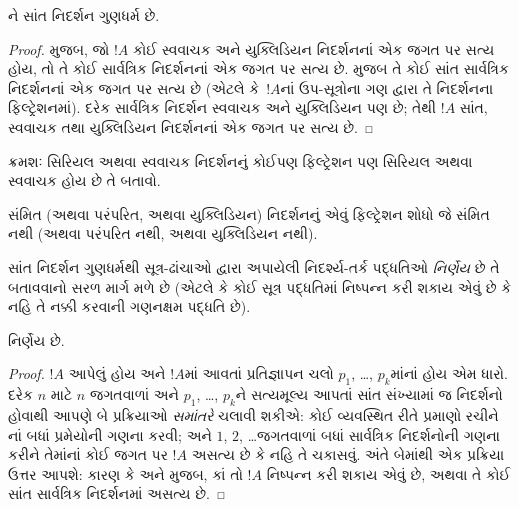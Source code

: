 \begin{cor}
  ને સાંત નિદર્શન ગુણધર્મ છે.
\end{cor}

\begin{proof}
   મુજબ, જો $!A$ કોઈ સ્વવાચક
  અને યુક્લિડિયન નિદર્શનનાં એક જગત પર સત્ય હોય, તો તે કોઈ
  સાર્વત્રિક નિદર્શનનાં એક જગત પર સત્ય છે.
   મુજબ તે કોઈ સાંત સાર્વત્રિક નિદર્શનનાં એક
  જગત પર સત્ય છે (એટલે કે~$!A$નાં ઉપ-સૂત્રોના ગણ દ્વારા
  તે નિદર્શનના ફિલ્ટ્રેશનમાં). દરેક સાર્વત્રિક નિદર્શન
  સ્વવાચક અને યુક્લિડિયન પણ છે; તેથી $!A$ સાંત,
  સ્વવાચક તથા યુક્લિડિયન નિદર્શનનાં એક જગત પર સત્ય છે.
\end{proof}

\begin{prob}
  ક્રમશઃ સિરિયલ અથવા સ્વવાચક નિદર્શનનું કોઈપણ
  ફિલ્ટ્રેશન પણ સિરિયલ અથવા સ્વવાચક હોય છે તે બતાવો.
\end{prob}

\begin{prob}
  સંમિત (અથવા પરંપરિત, અથવા યુક્લિડિયન) નિદર્શનનું એવું
  ફિલ્ટ્રેશન શોધો જે સંમિત નથી (અથવા પરંપરિત નથી, અથવા
  યુક્લિડિયન નથી).
\end{prob}
\endgroup

\begingroup
\makeatletter{}\makeatother


\label{guunit:OLP-0457}

સાંત નિદર્શન ગુણધર્મથી સૂત્ર-ઢાંચાઓ દ્વારા અપાયેલી નિદર્શ્ય-તર્ક
પદ્ધતિઓ \emph{નિર્ણેય} છે તે બતાવવાનો સરળ માર્ગ મળે છે (એટલે કે
કોઈ સૂત્ર પદ્ધતિમાં નિષ્પન્ન કરી શકાય એવું છે કે નહિ તે નક્કી કરવાની
ગણનક્ષમ પદ્ધતિ છે).

\begin{thm}
   નિર્ણેય છે.
\end{thm}

\begin{proof}
  $!A$ આપેલું હોય અને $!A$માં આવતાં પ્રતિજ્ઞાપન ચલો
  $p_1$, \dots, $p_k$માંનાં હોય એમ ધારો. દરેક $n$ માટે $n$ જગતવાળાં
  અને $p_1$, \dots, $p_k$ને સત્યમૂલ્ય આપતાં સાંત સંખ્યામાં જ નિદર્શનો
  હોવાથી આપણે બે પ્રક્રિયાઓ \emph{સમાંતરે} ચલાવી શકીએ: કોઈ વ્યવસ્થિત
  રીતે પ્રમાણો રચીને નાં બધાં પ્રમેયોની ગણના કરવી; અને
  $1$, $2$, \dots જગતવાળાં બધાં સાર્વત્રિક નિદર્શનોની ગણના કરીને
  તેમાંનાં કોઈ જગત પર $!A$ અસત્ય છે કે નહિ તે ચકાસવું.
  અંતે બેમાંથી એક પ્રક્રિયા ઉત્તર આપશે: કારણ કે
   અને  મુજબ,
  કાં તો $!A$ નિષ્પન્ન કરી શકાય એવું છે, અથવા તે કોઈ સાંત સાર્વત્રિક
  નિદર્શનમાં અસત્ય છે.
\end{proof}

